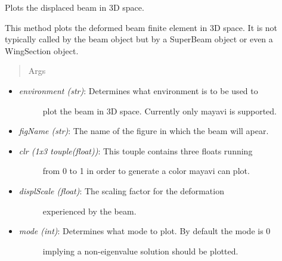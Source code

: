 \documentclass[letterpaper,10pt,english]{sphinxmanual}
\begin{document}
\begin{fulllineitems}
\begin{fulllineitems}
\begin{itemize}
\end{itemize}

\end{fulllineitems}


\begin{fulllineitems}
\label{structures:AeroComBAT.Structures.TBeam.plotDisplBeam}
Plots the displaced beam in 3D space.

This method plots the deformed beam finite element in 3D space. It is
not typically called by the beam object but by a SuperBeam object
or even a WingSection object.
\begin{quote}\begin{description}
\item[{Args}] \leavevmode
\end{description}\end{quote}
\begin{itemize}
\item {} \begin{description}
\item[{\emph{environment (str)}: Determines what environment is to be used to}] \leavevmode
plot the beam in 3D space. Currently only mayavi is supported.

\end{description}

\item {} 
\emph{figName (str)}: The name of the figure in which the beam will apear.

\item {} \begin{description}
\item[{\emph{clr (1x3 touple(float))}: This touple contains three floats running}] \leavevmode
from 0 to 1 in order to generate a color mayavi can plot.

\end{description}

\item {} \begin{description}
\item[{\emph{displScale (float)}: The scaling factor for the deformation}] \leavevmode
experienced by the beam.

\end{description}

\item {} \begin{description}
\item[{\emph{mode (int)}: Determines what mode to plot. By default the mode is 0}] \leavevmode
implying a non-eigenvalue solution should be plotted.


\end{description}
\end{itemize}
\end{fulllineitems}
\end{fulllineitems}
\end{document}

